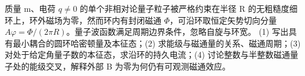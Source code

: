 质量 m、电荷 \(q\ne 0\) 的单个非相对论量子粒子被严格约束在半径 R 的无粗糙度细环上，环外磁场为零，然而环内有封闭磁通 \(\Phi \)，可沿环取恒定矢势切向分量 \(A\varphi =\Phi /(2\pi R)\)。量子波函数满足周期边界条件，忽略自旋与环宽。
(1) 写出具有最小耦合的圆环哈密顿量及本征态；(2) 求能级与磁通量的关系、磁通周期；(3) 对处于给定角量子数的本征态，求沿环的持久电流；(4) 讨论整数与半整数磁通量子处的能级交叉，解释外部 B 为零为何仍有可观测磁通效应。
